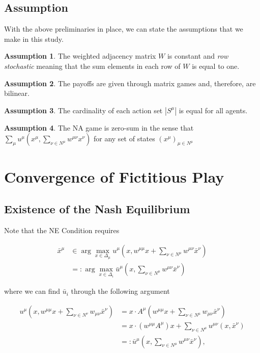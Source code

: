 \documentclass{article}
\theoremstyle{definition}
\newtheorem{assumption}{Assumption}
\newcommand{\weightset}{W}
\newcommand{\actionset}[1]{S^{#1}}
\newcommand{\wmunu}{w^{\mu \nu}}
\newcommand{\xmu}{x^{\mu}}
\newcommand{\xnu}{x^{\nu}}
\newcommand{\NE}[1]{\bar{x}^{#1}}
\newcommand{\weightedsum}{ \sum_{\nu \in N^\mu} \wmunu \xnu}
\begin{document}
	\subsection{Assumption}

	With the above preliminaries in place, we can state the assumptions that we make in this study.

	\begin{assumption}
		The weighted adjacency matrix $\weightset$ is constant and \emph{row stochastic} meaning
		that the sum elements in each row of $\weightset$ is equal to one.
	\end{assumption}

	\begin{assumption}
		The payoffs are given through matrix games and, therefore, are bilinear.
	\end{assumption}

	\begin{assumption}
		The cardinality of each action set $|\actionset{\mu}|$ is equal for all agents.
	\end{assumption}

	\begin{assumption}
		The NA game is zero-sum in the sense that $\sum_{\mu} u^\mu(\xmu, \weightedsum)$ for any set
		of states $(x^\mu)_{\mu \in N^\mu}$
	\end{assumption}

	\section{Convergence of Fictitious Play}

	\subsection{Existence of the Nash Equilibrium}
	
	Note that the NE Condition requires

	\begin{align}
		\NE{\mu} &\in \arg\max_{x \in \Delta_\mu} u^\mu(x, w^{\mu \mu}x + \sum_{\nu \in N^\mu} w^{\mu \nu} \NE{\nu}) \nonumber \\
		& =: \arg\max_{x \in \Delta_i} \bar{u}^\mu(x, \sum_{\nu \in N^\mu} w^{\mu \nu} \NE{\nu})
	\end{align}

	where we can find $\bar{u}_i$ through the following argument
	
	\begin{align}
		u^\mu(x, w^{\mu \mu} x + \sum_{\nu \in N^\nu} w_{\mu \nu} \NE{\nu}) & = x \cdot A^\mu (w^{\mu \mu} x + \sum_{\nu \in N^\mu} w_{\mu \nu} \NE{\nu}) \\
		 & = x \cdot (w^{\mu \mu} A^\mu)  x + \sum_{\nu \in N^\mu} u^{\mu \nu}(x, \NE{\nu}) \\
		 & =: \bar{u}^\mu(x, \sum_{\nu \in N^\mu} w^{\mu \nu} \NE{\nu}), \nonumber
	\end{align}
	
\end{document}
